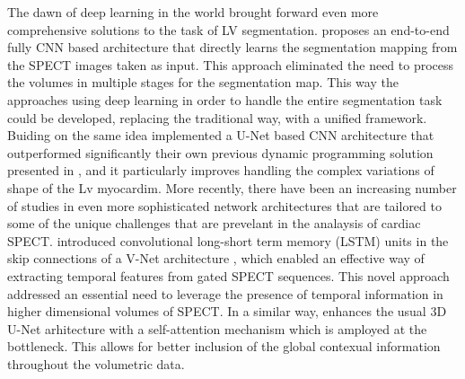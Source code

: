 The dawn of deep learning in the world brought forward even more comprehensive solutions to the task of LV segmentation. \cite{Wang2020} proposes an end-to-end fully CNN based architecture that directly learns the segmentation mapping from the SPECT images taken as input. This approach eliminated the need to process the volumes in multiple stages for the segmentation map. This way the approaches using deep learning in order to handle the entire segmentation task could be developed, replacing the traditional way, with a unified framework. Buiding on the same idea \cite{WEN2021166842} implemented a U-Net \cite{RFB15a} based CNN architecture that outperformed significantly their own previous dynamic programming solution presented in \cite{tang2017dynamic}, and it particularly improves handling the complex variations of shape of the Lv myocardim. More recently, there have been an increasing number of studies in even more sophisticated network architectures that are tailored to some of the unique challenges that are prevelant in the analaysis of cardiac SPECT. \cite{zhao2023spatial} introduced convolutional long-short term memory (LSTM) units in the skip connections of a V-Net architecture \cite{7785132}, which enabled an effective way of extracting temporal features from gated SPECT sequences. This novel approach addressed an essential need to leverage the presence of temporal information in higher dimensional volumes of SPECT. In a similar way, \cite{ZHANG2023107267} enhances the usual 3D U-Net arhitecture with a self-attention mechanism which is amployed at the bottleneck. This allows for better inclusion of the global contexual information throughout the volumetric data.